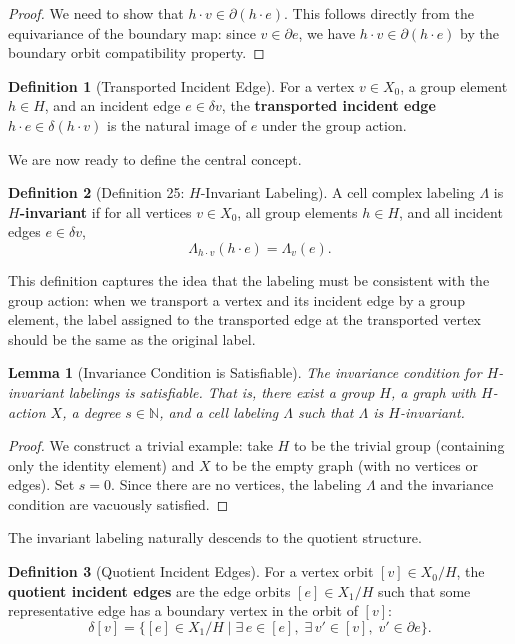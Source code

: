 \documentclass[11pt]{article}
\theoremstyle{plain}
\newtheorem*{lemma}{Lemma}
\theoremstyle{definition}
\newtheorem*{definition}{Definition}
\theoremstyle{remark}
\begin{document}
\begin{proof}
We need to show that $h \cdot v \in \partial(h \cdot e)$. This follows directly from the equivariance of the boundary map: since $v \in \partial e$, we have $h \cdot v \in \partial(h \cdot e)$ by the boundary orbit compatibility property.
\end{proof}

\begin{definition}[Transported Incident Edge]
For a vertex $v \in X_0$, a group element $h \in H$, and an incident edge $e \in \delta v$, the \textbf{transported incident edge} $h \cdot e \in \delta(h \cdot v)$ is the natural image of $e$ under the group action.
\end{definition}

We are now ready to define the central concept.

\begin{definition}[Definition 25: $H$-Invariant Labeling]
A cell complex labeling $\Lambda$ is \textbf{$H$-invariant} if for all vertices $v \in X_0$, all group elements $h \in H$, and all incident edges $e \in \delta v$,
\[
\Lambda_{h \cdot v}(h \cdot e) = \Lambda_v(e).
\]
\end{definition}

This definition captures the idea that the labeling must be consistent with the group action: when we transport a vertex and its incident edge by a group element, the label assigned to the transported edge at the transported vertex should be the same as the original label.

\begin{lemma}[Invariance Condition is Satisfiable]
The invariance condition for $H$-invariant labelings is satisfiable. That is, there exist a group $H$, a graph with $H$-action $X$, a degree $s \in \mathbb{N}$, and a cell labeling $\Lambda$ such that $\Lambda$ is $H$-invariant.
\end{lemma}

\begin{proof}
We construct a trivial example: take $H$ to be the trivial group (containing only the identity element) and $X$ to be the empty graph (with no vertices or edges). Set $s = 0$. Since there are no vertices, the labeling $\Lambda$ and the invariance condition are vacuously satisfied.
\end{proof}

The invariant labeling naturally descends to the quotient structure.

\begin{definition}[Quotient Incident Edges]
For a vertex orbit $[v] \in X_0/H$, the \textbf{quotient incident edges} are the edge orbits $[e] \in X_1/H$ such that some representative edge has a boundary vertex in the orbit of $[v]$:
\[
\delta[v] = \bigl\{ [e] \in X_1/H \mid \exists\, e \in [e],\; \exists\, v' \in [v],\; v' \in \partial e \bigr\}.
\]
\end{definition}
\end{document}
